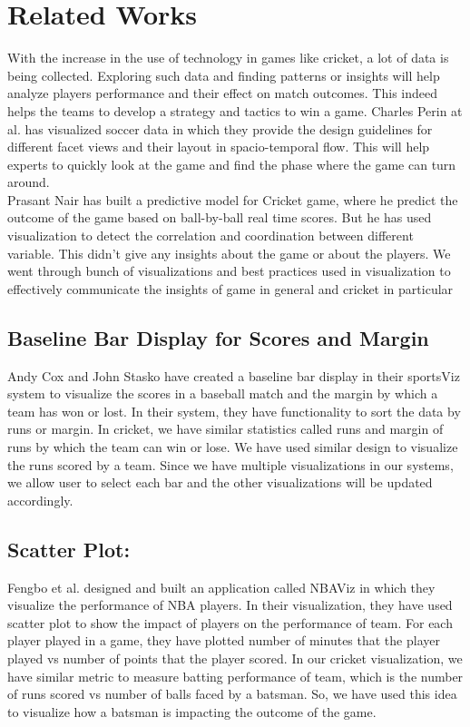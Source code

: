 \documentclass[10pt,journal,compsoc]{IEEEtran}
\begin{document}
\section {Related Works}
With the increase in the use of technology in games like cricket, a lot of data is being collected. Exploring such data and finding patterns or insights will help analyze players performance and their effect on match outcomes. This indeed helps the teams to develop a strategy and tactics to win a game. Charles Perin at al.\cite{soccer} has visualized soccer data in which they provide the design guidelines for different facet views and their layout in spacio-temporal flow. This will help experts to quickly look at the game and find the phase where the game can turn around.\\

\indent Prasant Nair has built a predictive model for Cricket game\cite{cricket}, where he predict the outcome of the game based on ball-by-ball real time scores. But he has used visualization to detect the correlation and coordination between different variable. This didn't give any insights about the game or about the players.
We went through bunch of visualizations and best practices used in visualization to effectively communicate the insights of game in general and cricket in particular

\subsection{Baseline Bar Display for Scores and Margin}
Andy Cox and John Stasko have created a baseline bar display in their sportsViz\cite{sportsvis} system to visualize the scores in a baseball match and the margin by which a team has won or lost. In their system, they have functionality to sort the data by runs or margin. In cricket, we have similar statistics called runs and margin of runs by which the team can win or lose. We have used similar design to visualize the runs scored by a team. Since we have multiple visualizations in our systems, we allow user to select each bar and the other visualizations will be updated accordingly.

\subsection{Scatter Plot:}
Fengbo et al. designed and built an application called NBAViz\cite{nbavis} in which they visualize the performance of NBA players. In their visualization, they have used scatter plot to show the impact of players on the performance of team. For each player played in a game, they have plotted number of minutes that the player played vs number of points that the player scored. In our cricket visualization, we have similar metric to measure batting performance of team, which is the number of runs scored vs number of balls faced by a batsman. So, we have used this idea to visualize how a batsman is impacting the outcome of the game.
\end{document}
